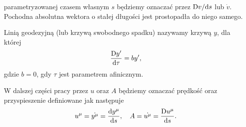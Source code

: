 parametryzowanej czasem własnym $s$
będziemy oznaczać przez $\text{D} v/\text{d} s$ lub $\dot{v}$. 
Pochodna absolutna wektora o stałej długości 
jest prostopadła do niego samego.
\begin{definition}
Linią geodezyjną (lub krzywą swobodnego spadku) nazywamy 
krzywą $y$, dla której
\begin{align*}
\frac{\text{D} y'}{\text{d} \tau } = b y',
\end{align*} 
gdzie $b=0$, gdy $\tau$ jest parametrem afinicznym.
\end{definition}
W dalszej części pracy przez $u$ oraz $A$ będziemy oznaczać
prędkość oraz przyspieszenie definiowane jak następuje
\begin{align*}
u^\mu = \dot{y^\mu} = \frac{\text{d} y^\mu}{\text{d} s}, 
\quad A = \dot{u^\mu} =  \frac{\text{D} u^\mu}{\text{d} s}.
\end{align*}

